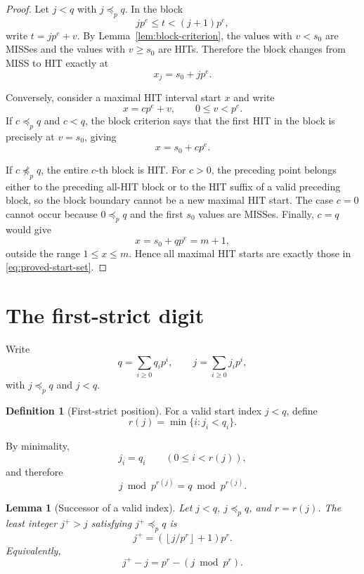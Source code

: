 \documentclass[11pt,a4paper]{article}
\newtheorem{lemma}[theorem]{Lemma}
\theoremstyle{definition}
\newtheorem{definition}[theorem]{Definition}
\theoremstyle{remark}
\newcommand{\floor}[1]{\left\lfloor #1\right\rfloor}
\begin{document}
\begin{proof}
Let $j<q$ with $j\preceq_p q$.  In the block
\[
jp^e\le t<(j+1)p^e,
\]
write $t=jp^e+v$.  By Lemma~\ref{lem:block-criterion}, the values with $v<s_0$ are MISSes and the values with $v\ge s_0$ are HITs.  Therefore the block changes from MISS to HIT exactly at
\[
x_j=s_0+jp^e.
\]

Conversely, consider a maximal HIT interval start $x$ and write
\[
x=cp^e+v,
\qquad 0\le v<p^e.
\]
If $c\preceq_p q$ and $c<q$, the block criterion says that the first HIT in the block is precisely at $v=s_0$, giving
\[
x=s_0+cp^e.
\]

If $c\not\preceq_p q$, the entire $c$-th block is HIT.  For $c>0$, the preceding point belongs either to the preceding all-HIT block or to the HIT suffix of a valid preceding block, so the block boundary cannot be a new maximal HIT start.  The case $c=0$ cannot occur because $0\preceq_p q$ and the first $s_0$ values are MISSes.  Finally, $c=q$ would give
\[
x=s_0+qp^e=m+1,
\]
outside the range $1\le x\le m$.  Hence all maximal HIT starts are exactly those in \eqref{eq:proved-start-set}.
\end{proof}

\section{The first-strict digit}

Write
\[
 q=\sum_{i\ge0}q_i p^i,
 \qquad
 j=\sum_{i\ge0}j_i p^i,
\]
with $j\preceq_p q$ and $j<q$.

\begin{definition}[First-strict position]
For a valid start index $j<q$, define
\begin{equation}
 r(j)=\min\{i:j_i<q_i\}.
 \label{eq:r-definition}
\end{equation}
\end{definition}

By minimality,
\begin{equation}
 j_i=q_i
 \qquad(0\le i<r(j)),
 \label{eq:lower-digits-equal}
\end{equation}
and therefore
\begin{equation}
\boxed{j\bmod p^{r(j)}=q\bmod p^{r(j)}}.
\label{eq:lower-residue}
\end{equation}

\begin{lemma}[Successor of a valid index]
\label{lem:successor}
Let $j<q$, $j\preceq_p q$, and $r=r(j)$.  The least integer $j^+>j$ satisfying $j^+\preceq_p q$ is
\begin{equation}
\boxed{
 j^+=\left(\floor{j/p^r}+1\right)p^r.
}
\label{eq:valid-successor}
\end{equation}
Equivalently,
\begin{equation}
\boxed{
 j^+-j=p^r-(j\bmod p^r).
}
\label{eq:index-gap}
\end{equation}
\end{lemma}
\end{document}
